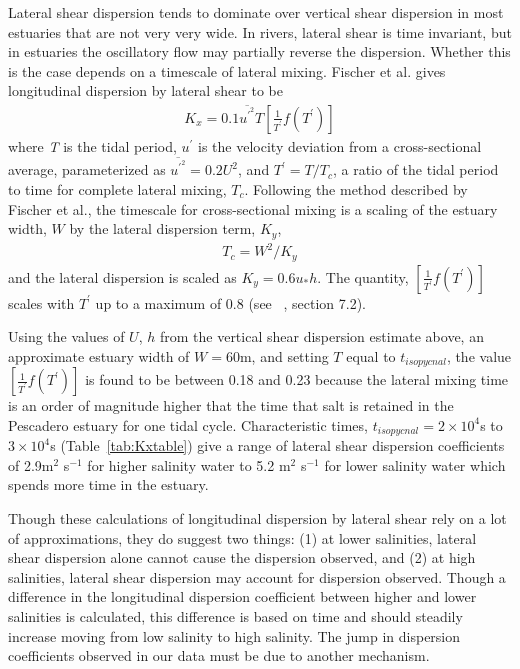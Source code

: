 Lateral shear dispersion tends to dominate over vertical shear dispersion in most estuaries that are not very very wide. In rivers, lateral shear is time invariant, but in estuaries the oscillatory flow may partially reverse the dispersion. Whether this is the case depends on a timescale of lateral mixing. Fischer et al. \parencite*{fischer_mixing_1979} gives longitudinal dispersion by lateral shear to be
\begin{eqnarray}
K_x = 0.1\overline{u^{'^2}}T\left[\frac{1}{T^{'}}f(T^{'})\right] \label{eq:Klatshear}
\end{eqnarray}
where \emph{T} is the tidal period, $u^{'}$ is the velocity deviation from a cross-sectional average, parameterized as $\overline{u^{'^2}}=0.2U^2$, and $T^{'}=T/T_c$, a ratio of the tidal period to time for complete lateral mixing, $T_c$. Following the method described by Fischer et al., the timescale for cross-sectional mixing is a scaling of the estuary width, $W$ by the lateral dispersion term, $K_y$, 
\begin{eqnarray}
T_c = W^2/K_y \label{eq:Tc}
\end{eqnarray}
and the lateral dispersion is scaled as $K_y = 0.6u_*h$. The quantity, $\left[\frac{1}{T^{'}}f(T^{'})\right]$ scales with $T^{'}$ up to a maximum of 0.8 (see ~\cite{fischer_mixing_1979}, section 7.2). 

Using the values of $U$, $h$ from the vertical shear dispersion estimate above, an approximate estuary width of $W=60$m, and setting $T$ equal to $t_{isopycnal}$, the value $\left[\frac{1}{T^{'}}f(T^{'})\right]$ is found to be between 0.18 and 0.23 because the lateral mixing time is an order of magnitude higher that the time that salt is retained in the Pescadero estuary for one tidal cycle. Characteristic times, $t_{isopycnal}=2\times10^4$s to $3\times10^4$s (Table~\ref{tab:Kxtable}) give a range of lateral shear dispersion coefficients of 2.9m$^2$ s$^{-1}$ for higher salinity water to 5.2 m$^2$ s$^{-1}$ for lower salinity water which spends more time in the estuary. 

Though these calculations of longitudinal dispersion by lateral shear rely on a lot of approximations, they do suggest two things: (1) at lower salinities, lateral shear dispersion alone cannot cause the dispersion observed, and (2) at high salinities, lateral shear dispersion may account for dispersion observed. Though a difference in the longitudinal dispersion coefficient between higher and lower salinities is calculated, this difference is based on time and should steadily increase moving from low salinity to high salinity. The jump in dispersion coefficients observed in our data must be due to another mechanism.  

